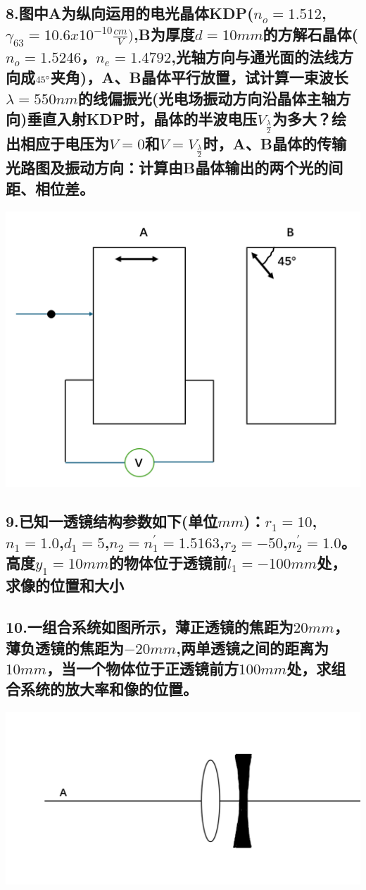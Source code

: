 \documentclass[11pt,a4paper]{article}
\begin{document}
    \subsection*{8.图中A为纵向运用的电光晶体KDP($n_{o}=1.512$,$\gamma_{63}=10.6x10^{-10}\frac{cm}{V})$,B为厚度$d=10mm$的方解石晶体($n_{o}=1.5246$，$n_{e}=1.4792$,光轴方向与通光面的法线方向成$45\degree$夹角)，A、B晶体平行放置，试计算一束波长$\lambda=550nm$的线偏振光(光电场振动方向沿晶体主轴方向)垂直入射KDP时，晶体的半波电压$V_{\frac{\lambda}{2}}$为多大？绘出相应于电压为$V=0$和$V=V_{\frac{\lambda}{2}}$时，A、B晶体的传输光路图及振动方向：计算由B晶体输出的两个光的间距、相位差。}
    \includegraphics[scale=0.5]{3.jpg}%
    \vspace{15mm}
    \subsection*{9.已知一透镜结构参数如下(单位$mm$)：$r_1=10$,$n_1=1.0$,$d_1=5$,$n_2=n_1^{'}=1.5163$,$r_2=-50$,$n_2^{'}=1.0$。高度$y_1=10mm$的物体位于透镜前$l_1=-100mm$处，求像的位置和大小}
    \vspace{20mm}
    \subsection*{10.一组合系统如图所示，薄正透镜的焦距为$20mm$，薄负透镜的焦距为$-20mm$,两单透镜之间的距离为$10mm$，当一个物体位于正透镜前方$100mm$处，求组合系统的放大率和像的位置。}
    \includegraphics[scale=0.5]{4.jpg}%
    \vspace{15mm}
\end{document}
